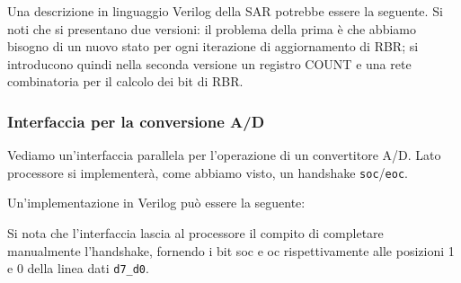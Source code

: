 \documentclass[a4paper,11pt]{article}
\begin{document}
Una descrizione in linguaggio Verilog della SAR potrebbe essere la seguente.
Si noti che si presentano due versioni: il problema della prima è che abbiamo bisogno di un nuovo stato per ogni iterazione di aggiornamento di RBR; si introducono quindi nella seconda versione un registro COUNT e una rete combinatoria per il calcolo dei bit di RBR.



\subsubsection{Interfaccia per la conversione A/D}
Vediamo un'interfaccia parallela per l'operazione di un convertitore A/D.
Lato processore si implementerà, come abbiamo visto, un handshake \lstinline|soc|/\lstinline|eoc|.

Un'implementazione in Verilog può essere la seguente:



Si nota che l'interfaccia lascia al processore il compito di completare manualmente l'handshake, fornendo i bit soc e oc rispettivamente alle posizioni 1 e 0 della linea dati \lstinline|d7_d0|. 
\end{document}
